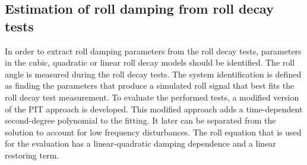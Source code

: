 \subsection{Estimation of roll damping from roll decay tests}
\label{se:experimental_estimation}
In order to extract roll damping parameters from the roll decay tests, parameters in the cubic, quadratic or linear roll decay models should be identified. The roll angle is measured during the roll decay tests. The system identification is defined as finding the parameters that produce a simulated roll signal that best fits the roll decay test measurement. 
To evaluate the performed tests, a modified version of the PIT approach is developed. This modified approach adds a time-dependent second-degree polynomial to the fitting. It later can be separated from the solution to account for low frequency disturbances. The roll equation that is used for the evaluation has a linear-quadratic damping dependence and a linear restoring term. 



%
%
%
%




